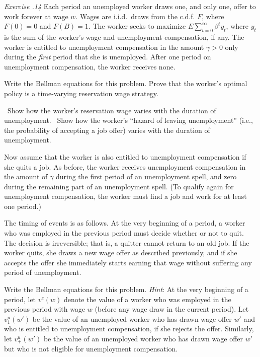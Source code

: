 \medskip
\noindent
{\it Exercise \the\chapternum.14} 
\medskip
\noindent Each period an unemployed worker draws one, and only
one, offer to work forever at wage $w$.  Wages are i.i.d.\ draws
from the c.d.f. $F$, where $F(0)=0$ and $F(B)=1$.    The worker seeks
to maximize $E \sum_{t=0}^\infty \beta^t y_t$, where $y_t$ is the
sum of the worker's wage and unemployment compensation, if any.
The worker is entitled to unemployment compensation in
the amount $\gamma >0$ only during
the {\it first} period that she is unemployed.  After
one period on unemployment compensation, the worker receives none.

\medskip
{}  Write the Bellman equations for this problem.
Prove that the worker's optimal policy is a time-varying reservation
wage strategy.

\medskip
{} \ Show how the worker's   reservation wage varies
with the duration of unemployment.
\medskip
{}  \ Show how the worker's ``hazard of leaving
unemployment'' (i.e., the probability of accepting a job offer)
varies with the duration of unemployment.

\medskip

Now assume that the worker is also entitled to unemployment compensation
if she quits a job. As before, the worker receives unemployment
compensation in the amount of $\gamma$ during the first period of
an unemployment spell, and zero during the remaining part of an
unemployment spell. (To qualify again for unemployment compensation, the
worker must find a job and work for at least one period.)



The timing of events is as follows. At the very beginning of a period,
a worker who was employed in the previous period must decide whether
or not to quit. The decision is irreversible; that is, a quitter cannot
return to an old job. If the worker quits, she draws a new wage offer
as described previously, and if she accepts the offer she immediately
starts earning that wage without suffering any period of unemployment.


\medskip
{} Write the Bellman equations for this problem.
{\it Hint}: At the very beginning of a period, let $v^e(w)$ denote the
value of a worker who was employed in the previous period with
wage $w$ (before any wage draw in the current period). Let $v^u_1(w')$
be the value of an unemployed worker who has drawn wage offer $w'$ and
who is entitled to unemployment compensation, if she rejects the
offer. Similarly, let $v^u_+(w')$ be the value of an unemployed
worker who has drawn wage offer $w'$ but who is not eligible for
unemployment compensation.


